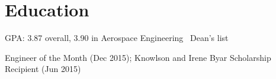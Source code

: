 \documentclass[letterpaper]{deedy-resume}
\begin{document}

\newpage 

\begin{minipage}[t]{\textwidth} %
\vspace{2ex}
    \section{Education}
    

    \vspace{1em}
    {}
    
    \begin{compactitem}
        \item GPA: 3.87 overall, 3.90 in Aerospace Engineering \textemdash\ Dean's list
        \item Engineer of the Month (Dec 2015); Knowlson and Irene Byar Scholarship Recipient (Jun 2015)
    \end{compactitem}

    \vspace*{2ex}

\end{minipage}
\end{document}
